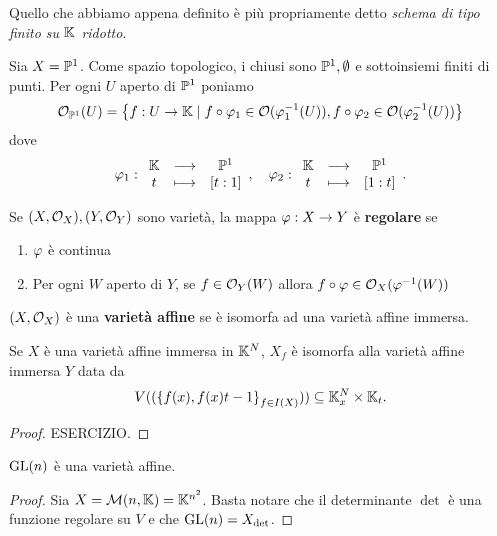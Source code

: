 \begin{remark}
Quello che abbiamo appena definito \`e pi\`u propriamente detto \textit{schema di tipo finito su $\mathbb{K}$ ridotto}.
\end{remark}


\begin{example}
Sia $X=\mathbb{P}^1$. Come spazio topologico, i chiusi sono $\mathbb{P}^1,\emptyset$ e sottoinsiemi finiti di punti. Per ogni $U$ aperto di $\mathbb{P}^1$ poniamo
\[\mathcal{O}_{\mathbb{P}^1}(U)=\left\{{f:U\to \mathbb{K}\mid f\circ \varphi_1\in\mathcal{O}(\varphi_1^{-1}(U)),f\circ \varphi_2\in\mathcal{O}(\varphi_2^{-1}(U))}\right\}\]
dove
\[\varphi_1:\begin{array}{ccc} {\mathbb{K}} & \longrightarrow & {\mathbb{P}^1}\\ {t} & \longmapsto & {[t:1]} \end{array},\quad \varphi_2:\begin{array}{ccc} {\mathbb{K}} & \longrightarrow & {\mathbb{P}^1}\\ {t} & \longmapsto & {[1:t]} \end{array}.\]
\end{example}

\begin{definition}
Se $(X,\mathcal{O}_X),(Y,\mathcal{O}_Y)$ sono variet\`a, la mappa $\varphi:X\to Y$ \`e \textbf{regolare} se
\begin{enumerate}
	\item $\varphi$ \`e continua
	\item Per ogni $W$ aperto di $Y$, se $f\in\mathcal{O}_Y(W)$ allora $f\circ \varphi\in \mathcal{O}_X(\varphi^{-1}(W))$
\end{enumerate}
\end{definition}

\begin{definition}
$(X,\mathcal{O}_X)$ \`e una \textbf{variet\`a affine} se \`e isomorfa ad una variet\`a affine immersa.
\end{definition}


\begin{proposition}
Se $X$ \`e una variet\`a affine immersa in $\mathbb{K}^N$, $X_f$ \`e isomorfa alla variet\`a affine immersa $Y$ data da 
\[V((\left\{{f(x),f(x)t-1}\right\}_{f\in I(X)}))\subseteq \mathbb{K}^N_x\times \mathbb{K}_t.\]
\end{proposition}
\begin{proof}
ESERCIZIO.
\end{proof}
\begin{corollary}[]
$\mathrm{GL}(n)$ \`e una variet\`a affine.
\end{corollary}
\begin{proof}
Sia $X=\mathcal{M}(n,\mathbb{K})= \mathbb{K}^{n^2}$. Basta notare che il determinante $\det$ \`e una funzione regolare su $V$ e che $\mathrm{GL}(n)=X_{\det}$.
\end{proof}


